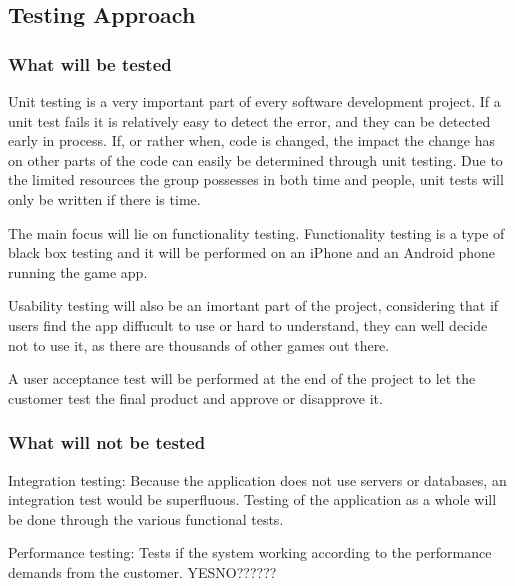 \subsection{Testing Approach}

\subsubsection{What will be tested}

Unit testing is a very important part of every software development project. If a unit test fails it is relatively easy to detect the error, and they can be detected early in process. If, or rather when, code is changed, the impact the change has on other parts of the code can easily be determined through unit testing. Due to the limited resources
the group possesses in both time and people, unit tests will only be written if there is time. 

The main focus will lie on functionality testing. Functionality testing is a type of black box testing and it will be performed on an iPhone and an Android phone running the game app.

Usability testing will also be an imortant part of the project, considering that if users find the app diffucult to use or hard to understand, they can well decide not to use it, as there are thousands of other games out there.

A user acceptance test will be performed at the end of the project to let the customer test the final product and
approve or disapprove it.

\subsubsection{What will not be tested}


Integration testing: Because the application does not use servers or databases, an integration test would be superfluous. Testing of the application as a whole will be done through the various functional tests.

Performance testing: Tests if the system working according to the performance demands from the customer. YESNO??????